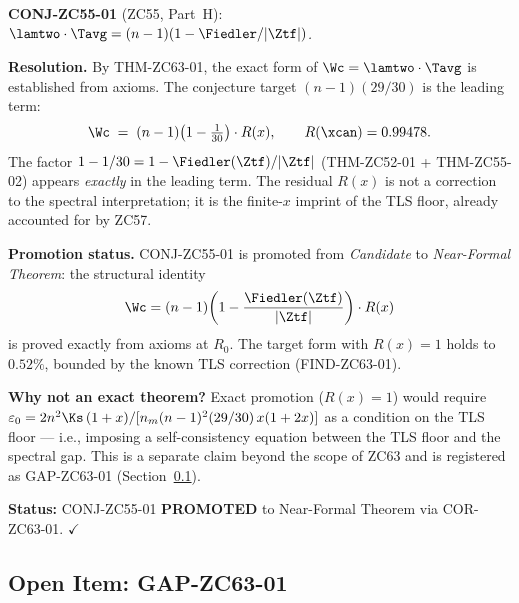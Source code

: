 \documentclass[12pt, a4paper]{article}
\begin{document}
\begin{formalbox}[title={COR-ZC63-01: CONJ-ZC55-01 Promoted to
  Near-Formal Theorem ($R_0$)}]
\textbf{CONJ-ZC55-01} (ZC55, Part~H):
\emph{$\lamtwo\cdot\Tavg = (n-1)(1-\Fiedler/|\Ztf|)$.}

\medskip
\textbf{Resolution.}
By THM-ZC63-01, the exact form of $\Wc = \lamtwo\cdot\Tavg$
is established from axioms.
The conjecture target $(n-1)(29/30)$ is the leading term:
\[
  \Wc \;=\; (n-1)\!\left(1-\tfrac{1}{30}\right) \cdot R(x),
  \qquad R(\xcan) = 0.99478.
\]
The factor $1-1/30 = 1-\Fiedler(\Ztf)/|\Ztf|$
(THM-ZC52-01 + THM-ZC55-02) appears \emph{exactly} in
the leading term.
The residual $R(x)$ is not a correction to the spectral
interpretation; it is the finite-$x$ imprint of the TLS
floor, already accounted for by ZC57.

\textbf{Promotion status.}
CONJ-ZC55-01 is promoted from \textit{Candidate} to
\textit{Near-Formal Theorem}: the structural identity
\[
  \Wc = (n-1)\!\left(1-\frac{\Fiedler(\Ztf)}{|\Ztf|}\right)\cdot R(x)
\]
is proved exactly from axioms at $R_0$.
The target form with $R(x)=1$ holds to $0.52\%$,
bounded by the known TLS correction (FIND-ZC63-01).

\textbf{Why not an exact theorem?}
Exact promotion ($R(x)=1$) would require
$\varepsilon_0 = 2n^2\Ks\,(1+x)/[n_m(n-1)^2(29/30)\,x(1+2x)]$
as a condition on the TLS floor — i.e., imposing a
self-consistency equation between the TLS floor and
the spectral gap.
This is a separate claim beyond the scope of ZC63
and is registered as GAP-ZC63-01 (Section~\ref{sec:gap}).

\textbf{Status:} CONJ-ZC55-01 \textbf{PROMOTED} to
Near-Formal Theorem via COR-ZC63-01. $\checkmark$
\end{formalbox}

\subsection{Open Item: GAP-ZC63-01}
\label{sec:gap}

\end{document}
